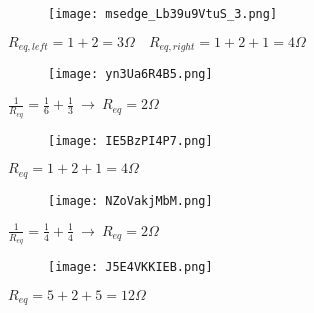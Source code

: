 \documentclass{article}
\begin{document}
{\begin{figure}[H]
    \centering
    \texttt{[image: msedge\_Lb39u9VtuS\_3.png]}
\end{figure}

\begin{center}
{\Large $R_{eq, left} = 1 + 2 = 3 \Omega \quad R_{eq, right} = 1 + 2 + 1 = 4 \Omega$}
\end{center}

{\vspace{8mm}}

\begin{figure}[H]
    \centering
    \texttt{[image: yn3Ua6R4B5.png]}
\end{figure}

\begin{center}
{ \Large $\displaystyle \frac{1}{R_{eq}} = \frac{1}{6} + \frac{1}{3} \ \rightarrow \ R_{eq} = 2 \Omega$}
\end{center}

{\vspace{8mm}}

\begin{figure}[H]
    \centering
    \texttt{[image: IE5BzPI4P7.png]}
\end{figure}

\begin{center}
{\Large $\displaystyle R_{eq} = 1 + 2 + 1 = 4 \Omega$}
\end{center}

{\vspace{8mm}}

\begin{figure}[H]
    \centering
    \texttt{[image: NZoVakjMbM.png]}
\end{figure}

\begin{center}
{\Large $\displaystyle \frac1{R_{eq}} = \frac{1}{4} + \frac{1}{4} \ \rightarrow \ R_{eq} = 2 \Omega$}
\end{center}

{\vspace{8mm}}

\begin{figure}[H]
    \centering
    \texttt{[image: J5E4VKKIEB.png]}
\end{figure}

\begin{center}
{\Large $\displaystyle R_{eq} = 5 + 2 + 5 = 12 \Omega$}
\end{center}

}
\end{document}
